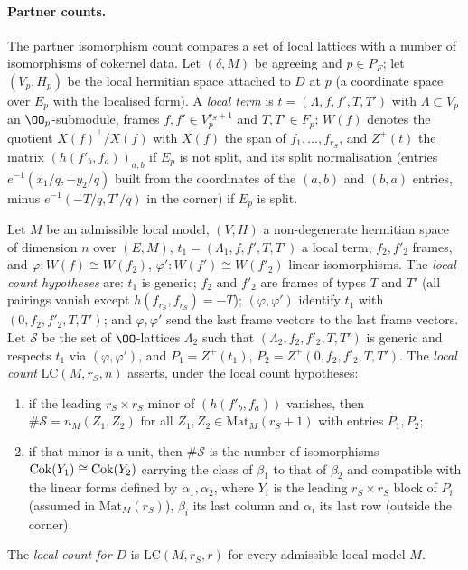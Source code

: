 \paragraph{Partner counts.} The partner isomorphism count compares a set of local lattices with a number of isomorphisms of
cokernel data. Let $(\delta,M)$ be agreeing and $p\in P_F$; let $(V_p,H_p)$ be the local hermitian space attached to $D$ at $p$ (a
coordinate space over $E_p$ with the localised form). A \emph{local term} is $t=(\Lambda,f,f',T,T')$ with $\Lambda\subset V_p$ an
$\OO_p$-submodule, frames $f,f'\in V_p^{r_S+1}$ and $T,T'\in F_p$; $W(f)$ denotes the quotient $X(f)^\perp/X(f)$ with $X(f)$ the span
of $f_1,\dots,f_{r_S}$, and $Z^+(t)$ the matrix $(h(f'_b,f_a))_{a,b}$ if $E_p$ is not split, and its split normalisation
(entries $e^{-1}(x_1/q,-y_2/q)$ built from the coordinates of the $(a,b)$ and $(b,a)$ entries, minus $e^{-1}(-T/q,T'/q)$ in the
corner) if $E_p$ is split.

\begin{definition}\label{pf:thmS-leaves:def:localcount}
Let $M$ be an admissible local model, $(V,H)$ a non-degenerate hermitian space of dimension $n$ over $(E,M)$, $t_1=(\Lambda_1,f,f',T,T')$ a
local term, $f_2,f'_2$ frames, and $\varphi:W(f)\cong W(f_2)$, $\varphi':W(f')\cong W(f'_2)$ linear isomorphisms. The \emph{local count
hypotheses} are: $t_1$ is generic; $f_2$ and $f'_2$ are frames of types $T$ and $T'$ (all pairings vanish except
$h(f_{r_S},f_{r_S})=-T$); $(\varphi,\varphi')$ identify $t_1$ with $(0,f_2,f'_2,T,T')$; and $\varphi,\varphi'$ send the last frame vectors to
the last frame vectors. Let $\mathcal S$ be the set of $\OO$-lattices $\Lambda_2$ such that $(\Lambda_2,f_2,f'_2,T,T')$ is generic and
respects $t_1$ via $(\varphi,\varphi')$, and $P_1=Z^+(t_1)$, $P_2=Z^+(0,f_2,f'_2,T,T')$. The \emph{local count} $\mathrm{LC}(M,r_S,n)$ asserts,
under the local count hypotheses:
\begin{enumerate}
\item if the leading $r_S\times r_S$ minor of $(h(f'_b,f_a))$ vanishes, then $\#\mathcal S=n_M(Z_1,Z_2)$ for all
$Z_1,Z_2\in\mathrm{Mat}_M(r_S+1)$ with entries $P_1,P_2$;
\item if that minor is a unit, then $\#\mathcal S$ is the number of isomorphisms $\mathrm{Cok}(Y_1)\cong\mathrm{Cok}(Y_2)$ carrying the
class of $\beta_1$ to that of $\beta_2$ and compatible with the linear forms defined by $\alpha_1,\alpha_2$, where $Y_i$ is the leading
$r_S\times r_S$ block of $P_i$ (assumed in $\mathrm{Mat}_M(r_S)$), $\beta_i$ its last column and $\alpha_i$ its last row (outside the corner).
\end{enumerate}
The \emph{local count for $D$} is $\mathrm{LC}(M,r_S,r)$ for every admissible local model $M$.
\end{definition}

